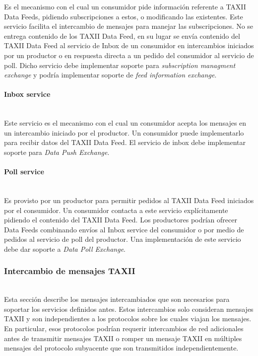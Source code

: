 Es el mecanismo con el cual un consumidor pide información referente a TAXII 
Data Feeds, pidiendo subscripciones a estos, o modificando las existentes. Este 
servicio facilita el intercambio de mensajes para manejar las subscripciones. 
No se entrega contenido de los TAXII Data Feed, en su lugar se envía 
contenido del TAXII Data Feed al servicio de Inbox de un consumidor en intercambios 
iniciados por un productor o en respuesta directa a un pedido del consumidor al 
servicio de poll.
Dicho servicio debe implementar soporte para \textit{subscription managment exchange} y podría implementar soporte de \textit{feed information exchange}.

\paragraph{Inbox service}\ \\
Este servicio es el mecanismo con el cual un consumidor acepta los mensajes en 
un intercambio iniciado por el productor. Un consumidor puede implementarlo 
para recibir datos del TAXII Data Feed.
El servicio de inbox debe implementar soporte para \textit{Data Push Exchange}.

\paragraph{Poll service}\ \\
Es provisto por un productor para permitir pedidos al TAXII Data Feed iniciados 
por  el consumidor. Un consumidor contacta a este servicio explícitamente 
pidiendo el contenido del TAXII Data Feed. Los productores podrían ofrecer Data 
Feeds combinando envíos al Inbox service del consumidor o por medio de pedidos 
al servicio de poll del productor.
Una implementación de este servicio debe dar soporte a \textit{Data Poll Exchange}.

\subsubsection{Intercambio de mensajes TAXII}\ \\

Esta sección describe los mensajes intercambiados que son necesarios para soportar 
los servicios definidos antes. Estos intercambios solo consideran mensajes 
TAXII y son independientes a los protocolos sobre los cuales viajan los mensajes.
 En particular, esos protocolos podrían requerir intercambios de red 
adicionales antes de transmitir mensajes TAXII o romper un mensaje TAXII en 
múltiples mensajes del protocolo subyacente que son transmitidos 
independientemente.


